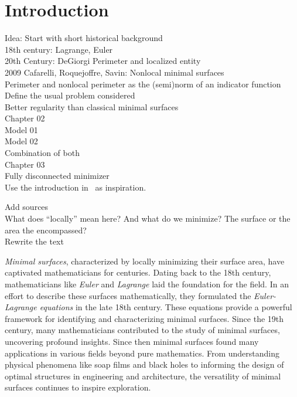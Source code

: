 \chapter{Introduction}
\label{ch:introduction}

\begin{IDEA}
	Idea: Start with short historical background\\
	18th century: Lagrange, Euler\\
	20th Century: DeGiorgi Perimeter and localized entity\\
	2009 Cafarelli, Roquejoffre, Savin: Nonlocal minimal surfaces\\
	Perimeter and nonlocal perimeter as the (semi)norm of an indicator function\\
	Define the usual problem considered\\
	Better regularity than classical minimal surfaces\\

	Chapter 02\\
	Model 01\\
	Model 02\\
	Combination of both\\

	Chapter 03\\
	Fully disconnected minimizer\\

	Use the introduction in~\cite{dipierro2012asymptotics} as inspiration.
\end{IDEA}

\begin{TODO}
	Add sources \\
	What does \enquote{locally} mean here? And what do we minimize? The surface or the area
	the encompassed?\\
	Rewrite the text\\
\end{TODO}

\emph{Minimal surfaces}, characterized by locally minimizing their surface area, have
captivated mathematicians for centuries. Dating back to the 18th century, mathematicians
like \emph{Euler} and \emph{Lagrange} laid the foundation for the field. In an effort to
describe these surfaces mathematically, they formulated the \emph{Euler-Lagrange
	equations} in the late 18th century. These equations provide a powerful framework for
identifying and characterizing minimal surfaces. Since the 19th century, many
mathematicians contributed to the study of minimal surfaces, uncovering profound insights.
Since then minimal surfaces found many applications in various fields beyond pure
mathematics. From understanding physical phenomena like soap films and black holes to
informing the design of optimal structures in engineering and architecture, the
versatility of minimal surfaces continues to inspire exploration.\newline

